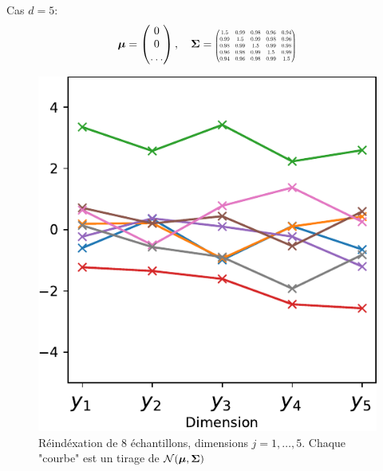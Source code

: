 \documentclass[xcolor=svgnames, t]{beamer}
\newcommand{\vectorx}[1]{\boldsymbol{\MakeLowercase{\mathbf{#1}}}}
\newcommand{\matrixx}[1]{\boldsymbol{\MakeUppercase{#1}}}
\newcommand{\scalemath}[2]{\scalebox{#1}{\mbox{\ensuremath{\displaystyle #2}}}}
\begin{document}
\begin{frame}{\subsecname}
  Cas $d=5$:
  \begin{equation*}
    \vectorx{\mu}
    =
    \begin{pmatrix}
      0 \\
      0 \\
      \dots
    \end{pmatrix},
    \quad
    \matrixx{\Sigma}
    =
    \scalemath{0.5}{
      \begin{pmatrix}
        1.5 & 0.99 & 0.98 & 0.96 & 0.94 \\
        0.99 & 1.5 & 0.99 & 0.98 & 0.96 \\
        0.98 & 0.99 & 1.5 & 0.99 & 0.98 \\
        0.96 & 0.98 & 0.99 & 1.5 & 0.99 \\
        0.94 & 0.96 & 0.98 & 0.99 & 1.5
        \end{pmatrix}
    }
  \end{equation*}
  \begin{figure}[h]
    \includegraphics[scale=0.4]{gaussian_5d_valuevsindex.pdf}
    \caption{Réindéxation de $8$ échantillons, dimensions $j=1, \dots, 5$.
    Chaque "courbe" est un tirage de $\mathcal{N}(\vectorx{\mu} , \matrixx{\Sigma})$
    }
  \end{figure}
\end{frame}
\end{document}
